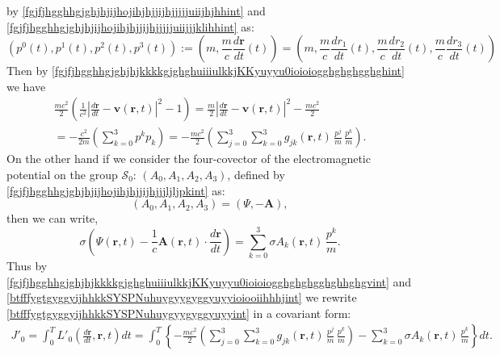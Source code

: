 \documentclass{article}
\theoremstyle{definition}
\theoremstyle{remark}
\renewcommand{\vec}[1]{\mathbf{#1}}
\newcommand{\er}{\eqref}
\newcommand{\er}{\eqref}
\begin{document}
by \er{fgjfjhgghhgjghjhjijhojihjhjjijhjjjjjuiijhjhhint} and
\er{fgjfjhgghhgjghjhjijhojihjhjjijhjjjjjuiijjjklihhint} as:
\begin{equation}\label{fgjfjhgghhgjghjhjijhojihjhjjijhjjjjjuiijhjhhioiint}
\left(
p^0(t),p^1(t),p^2(t),p^3(t)\right):=\left(m,\frac{m}{c}\frac{d\vec
r}{dt}(t)\right)=
\left(m,\frac{m}{c}\frac{dr_1}{dt}(t),\frac{m}{c}\frac{dr_2}{dt}(t),\frac{m}{c}\frac{dr_3}{dt}(t)\right)
\end{equation}
Then by
\er{fgjfjhgghhgjghjhjkkkkgjghghuiiiulkkjKKyuyyu0ioioiogghghghgghghint}
we have
\begin{multline}\label{fgjfjhgghhgjghjhjkkkkgjghghuiiiulkkjKKyuyyu0ioioiogghghghgghghhghgvint}
\frac{mc^2}{2}\left(\frac{1}{c^2}\left|\frac{d\vec r}{dt}-\vec
v(\vec r,t)\right|^2-1\right)=\frac{m}{2}\left|\frac{d\vec
r}{dt}-\vec v(\vec
r,t)\right|^2-\frac{mc^2}{2}\\=-\frac{c^2}{2m}\left(\sum_{k=0}^{3}p^kp_k\right)=-\frac{mc^2}{2}\left(\sum_{j=0}^{3}\sum_{k=0}^{3}g_{jk}(\vec
r,t)\,\frac{p^j}{m}\,\frac{p^k}{m}\right).
\end{multline}
On the other hand if we consider the four-covector of the
electromagnetic potential on the group $\mathcal{S}_0$:
$(A_0,A_1,A_2,A_3)$, defined by
\er{fgjfjhgghhgjghjhjijhojihjhjjijhjjjljljpkint} as:
\begin{equation}\label{fgjfjhgghhgjghjhjijhojihjhjjijhjjjljljpkyuuyyuhhhhjint}
(A_0,A_1,A_2,A_3)=(\Psi,-\vec A),
\end{equation}
then we can write,
\begin{equation}\label{btfffygtgyggyijhhkkSYSPNuhuygyygyggyuyyioiooiihhhjint}
\sigma\left(\Psi(\vec r,t)-\frac{1}{c}\vec A(\vec
r,t)\cdot\frac{d\vec r}{dt}\right)=\sum_{k=0}^{3}\sigma A_k(\vec
r,t)\,\frac{p^k}{m}.
\end{equation}
Thus by
\er{fgjfjhgghhgjghjhjkkkkgjghghuiiiulkkjKKyuyyu0ioioiogghghghgghghhghgvint}
and \er{btfffygtgyggyijhhkkSYSPNuhuygyygyggyuyyioiooiihhhjint} we
rewrite \er{btfffygtgyggyijhhkkSYSPNuhuygyygyggyuyyint} in a
covariant form:
\begin{multline}\label{btfffygtgyggyijhhkkSYSPNuhuygyygyggyuyyuyuyint}
J'_0=\int_0^T L'_0\left(\frac{d\vec r}{dt},\vec r,t\right)dt=
\int_0^T\left\{-\frac{mc^2}{2}\left(\sum_{j=0}^{3}\sum_{k=0}^{3}g_{jk}(\vec
r,t)\,\frac{p^j}{m}\,\frac{p^k}{m}\right)-\sum_{k=0}^{3}\sigma
A_k(\vec r,t)\,\frac{p^k}{m}\right\}dt.
\end{multline}
\end{document}
